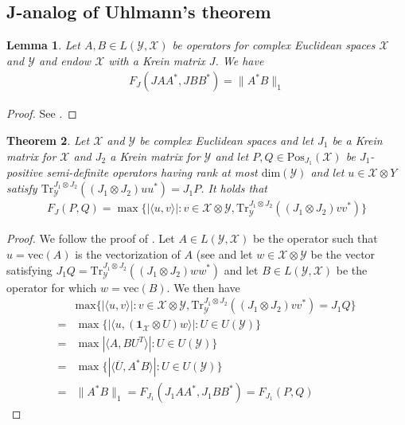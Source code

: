 \documentclass{amsart}
\numberwithin{equation}{section}
\newtheorem{theorem}{Theorem}[section]
\newtheorem{lemma}[theorem]{Lemma}
\theoremstyle{definition}
\theoremstyle{plain}
\theoremstyle{solutionstyle}
\begin{document}
\subsection{J-analog of Uhlmann's theorem}
\begin{lemma}
    Let $A,B\in L(\mathcal{Y},\mathcal{X})$ be operators for complex Euclidean spaces $\mathcal{X}$ and $\mathcal{Y}$ and endow $\mathcal{X}$ with a Krein matrix $J$. We have 
    \begin{align*}
        F_J(JAA^*,JBB^*)=\|A^*B\|_1
    \end{align*}
\end{lemma}
\begin{proof}
   See \cite[p.~151]{Watrous_2018}.
\end{proof}
\begin{theorem}
    Let $\mathcal{X}$ and $\mathcal{Y}$ be complex Euclidean spaces and let $J_1$ be a Krein matrix for $\mathcal{X}$ and $J_2$ a Krein matrix for $\mathcal{Y}$ and let $P,Q\in \mathrm{Pos}_{J_1}(\mathcal{X})$ be $J_1$-positive semi-definite operators having rank at most $\mathrm{dim}(\mathcal{Y})$ and let $u\in \mathcal{X}\otimes {Y}$ satisfy $\mathrm{Tr}^{J_1\otimes J_2}_{\mathcal{Y}}((J_1\otimes J_2)uu^*)=J_1P$. It holds that 
    \begin{align*}
        F_J(P,Q)=\max\{|\langle u, v\rangle|:v\in \mathcal{X}\otimes \mathcal{Y}, \mathrm{Tr}_{\mathcal{Y}}^{J_1\otimes J_2}((J_1\otimes J_2)vv^*) \}
    \end{align*}
\end{theorem}
\begin{proof}
We follow the proof of \citep[p.~151--152]{Watrous_2018}.
    Let $A\in L(\mathcal{Y},\mathcal{X})$ be the operator such that $u=\mathrm{vec}(A)$ is the vectorization of $A$ (see \citep[p.~23]{Watrous_2018} and let $w\in \mathcal{X}\otimes \mathcal{Y}$ be the vector satisfying $J_1Q=\mathrm{Tr}_{\mathcal{Y}}^{J_1\otimes J_2}((J_1\otimes J_2)ww^*)$ and let $B\in L(\mathcal{Y},\mathcal{X})$ be the operator for which $w=\mathrm{vec}(B)$. We then have 
    \begin{align*}
        &\mathrm{max}\{|\langle u,v\rangle|: v\in \mathcal{X}\otimes \mathcal{Y}, \mathrm{Tr}_{\mathcal{Y}}^{J_1\otimes J_2}((J_1\otimes J_2)vv^*)=J_1Q\}\\
        =& \max\{|\langle u, (\mathbf{1}_{\mathcal{X}}\otimes U)w\rangle| :U\in U(\mathcal{Y})\}\\
        =&\max{|\langle A,BU^T\rangle|:U\in U(\mathcal{Y})}\}\\
        =& \max\{|\langle \overline{U}, A^*B\rangle|:U\in U(\mathcal{Y})\}\\
        =&\|A^*B\|_1=F_{J_1}(J_1AA^*,J_1BB^*)=F_{J_1}(P,Q)
    \end{align*}
\end{proof}
\end{document}
